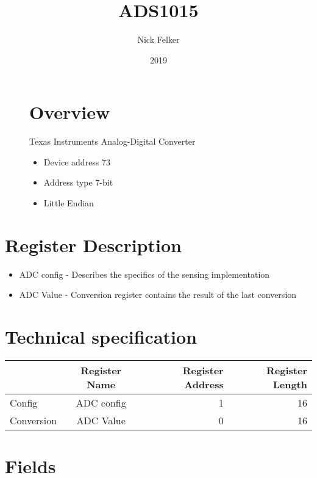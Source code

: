 \documentclass[a4paper,12pt,oneside,pdflatex,italian,final,twocolumn]{article}
\title{ ADS1015 }
\author{ Nick Felker }
\date{ 2019 }
\begin{document}
\pagestyle{fancy}



\onecolumn


\begin{figure}
\begin{minipage}{0.47\textwidth}

\section{Overview}
    Texas Instruments Analog-Digital Converter
    \begin{itemize}
        \item Device address 73
        \item Address type 7-bit
        \item Little Endian
    \end{itemize}


\end{minipage}
\hfill

\end{figure}


\section{Register Description}
\begin{itemize}
\item ADC config - Describes the specifics of the sensing implementation
\item ADC Value - Conversion register contains the result of the last conversion
\end{itemize}

\section{Technical specification}
\centering
\begin{tabular}{lcrr}
\toprule
 & Register Name & Register Address & Register Length \\
\midrule
Config & ADC config & 1 & 16 \\
Conversion & ADC Value & 0 & 16 \\
\bottomrule
\end{tabular}

\raggedright

\section{Fields}
\end{document}
